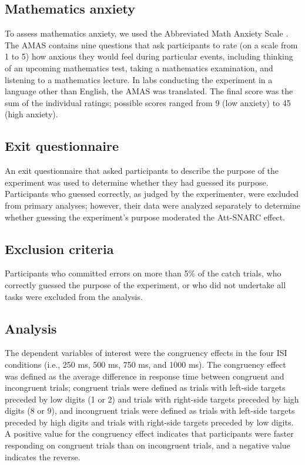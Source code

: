 \documentclass[man,floatsintext]{apa6}
\theoremstyle{definition}
\theoremstyle{definition}
\theoremstyle{definition}
\theoremstyle{remark}
\begin{document}
\subsection{Mathematics anxiety}\label{mathematics-anxiety}

To assess mathematics anxiety, we used the Abbreviated Math Anxiety
Scale \autocite[AMAS;][]{Hopko:2003et}. The AMAS contains nine questions
that ask participants to rate (on a scale from 1 to 5) how anxious they
would feel during particular events, including thinking of an upcoming
mathematics test, taking a mathematics examination, and listening to a
mathematics lecture. In labs conducting the experiment in a language
other than English, the AMAS was translated. The final score was the sum
of the individual ratings; possible scores ranged from 9 (low anxiety)
to 45 (high anxiety).

\subsection{Exit questionnaire}\label{exit-questionnaire}

An exit questionnaire that asked participants to describe the purpose of
the experiment was used to determine whether they had guessed its
purpose. Participants who guessed correctly, as judged by the
experimenter, were excluded from primary analyses; however, their data
were analyzed separately to determine whether guessing the experiment's
purpose moderated the Att-SNARC effect.

\subsection{Exclusion criteria}\label{exclusion-criteria}

Participants who committed errors on more than 5\% of the catch trials,
who correctly guessed the purpose of the experiment, or who did not
undertake all tasks were excluded from the analysis.

\subsection{Analysis}\label{analysis}

The dependent variables of interest were the congruency effects in the
four ISI conditions (i.e., 250 ms, 500 ms, 750 ms, and 1000 ms). The
congruency effect was defined as the average difference in response time
between congruent and incongruent trials; congruent trials were defined
as trials with left-side targets preceded by low digits (1 or 2) and
trials with right-side targets preceded by high digits (8 or 9), and
incongruent trials were defined as trials with left-side targets
preceded by high digits and trials with right-side targets preceded by
low digits. A positive value for the congruency effect indicates that
participants were faster responding on congruent trials than on
incongruent trials, and a negative value indicates the reverse.
\end{document}
